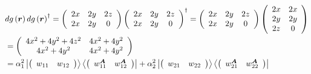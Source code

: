 \documentclass[aps,preprint]{revtex4}%
\begin{document}
\begin{align}
&  dg\left(  \boldsymbol{r}\right)  dg\left(  \boldsymbol{r}\right)
^{\dagger}=\left(
\begin{array}
[c]{ccc}%
2x & 2y & 2z\\
2x & 2y & 0
\end{array}
\right)  \left(
\begin{array}
[c]{ccc}%
2x & 2y & 2z\\
2x & 2y & 0
\end{array}
\right)  ^{\dagger}=\left(
\begin{array}
[c]{ccc}%
2x & 2y & 2z\\
2x & 2y & 0
\end{array}
\right)  \left(
\begin{array}
[c]{cc}%
2x & 2x\\
2y & 2y\\
2z & 0
\end{array}
\right) \nonumber\\
&  =\left(
\begin{array}
[c]{cc}%
4x^{2}+4y^{2}+4z^{2} & 4x^{2}+4y^{2}\\
4x^{2}+4y^{2} & 4x^{2}+4y^{2}%
\end{array}
\right) \nonumber\\
&  =\alpha_{1}^{2}\left\vert \left(
\begin{array}
[c]{cc}%
w_{11} & w_{12}%
\end{array}
\right)  \right\rangle \left\langle \left(
\begin{array}
[c]{cc}%
w_{11}^{\boldsymbol{A}} & w_{12}^{\boldsymbol{A}}%
\end{array}
\right)  \right\vert +\alpha_{2}^{2}\left\vert \left(
\begin{array}
[c]{cc}%
w_{21} & w_{22}%
\end{array}
\right)  \right\rangle \left\langle \left(
\begin{array}
[c]{cc}%
w_{21}^{\boldsymbol{A}} & w_{22}^{\boldsymbol{A}}%
\end{array}
\right)  \right\vert
\end{align}%
\end{document}
